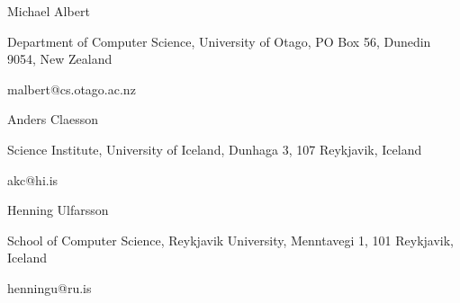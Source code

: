 


\begin{cventries}


\cventry
{Michael Albert}
{}
{}
{}
{
\begin{cvitems} %
  \item {Department of Computer Science, University of Otago, PO Box 56, Dunedin 9054, New Zealand}
  \item {malbert@cs.otago.ac.nz}
\end{cvitems}
}


\cventry
{Anders Claesson}
{}
{}
{}
{
\begin{cvitems} %
  \item {Science Institute, University of Iceland, Dunhaga 3, 107 Reykjavik, Iceland}
  \item {akc@hi.is}
\end{cvitems}
}


\cventry
{Henning Ulfarsson}
{}
{}
{}
{
\begin{cvitems} %
  \item {School of Computer Science, Reykjavik University, Menntavegi 1, 101 Reykjavik, Iceland}
  \item {henningu@ru.is}
\end{cvitems}
}



\end{cventries}
